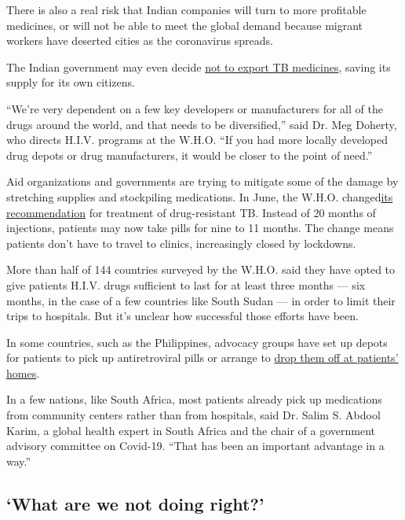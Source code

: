 There is also a real risk that Indian companies will turn to more
profitable medicines, or will not be able to meet the global demand
because migrant workers have deserted cities as the coronavirus spreads.

The Indian government may even decide
\href{https://theprint.in/health/india-could-ban-export-of-anti-tb-drugs-as-lockdown-hits-production/406119/}{not
to export TB medicines}, saving its supply for its own citizens.

``We're very dependent on a few key developers or manufacturers for all
of the drugs around the world, and that needs to be diversified,'' said
Dr. Meg Doherty, who directs H.I.V. programs at the W.H.O. ``If you had
more locally developed drug depots or drug manufacturers, it would be
closer to the point of need.''

Aid organizations and governments are trying to mitigate some of the
damage by stretching supplies and stockpiling medications. In June, the
W.H.O.
changed\href{https://www.who.int/news-room/detail/15-06-2020-who-urges-countries-to-enable-access-to-fully-oral-drug-resistant-tb-treatment-regimens}{its
recommendation} for treatment of drug-resistant TB. Instead of 20 months
of injections, patients may now take pills for nine to 11 months. The
change means patients don't have to travel to clinics, increasingly
closed by lockdowns.

More than half of 144 countries surveyed by the W.H.O. said they have
opted to give patients H.I.V. drugs sufficient to last for at least
three months --- six months, in the case of a few countries like South
Sudan --- in order to limit their trips to hospitals. But it's unclear
how successful those efforts have been.

In some countries, such as the Philippines, advocacy groups have set up
depots for patients to pick up antiretroviral pills or arrange to
\href{https://www.unaids.org/en/resources/presscentre/featurestories/2020/april/20200408_philippines}{drop
them off at patients' homes}.

In a few nations, like South Africa, most patients already pick up
medications from community centers rather than from hospitals, said Dr.
Salim S. Abdool Karim, a global health expert in South Africa and the
chair of a government advisory committee on Covid-19. ``That has been an
important advantage in a way.''

\hypertarget{what-are-we-not-doing-right}{%
\subsection{`What are we not doing
right?'}\label{what-are-we-not-doing-right}}

